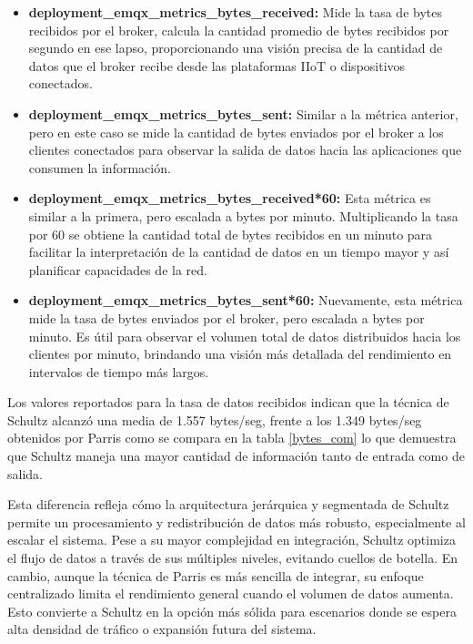 \begin{itemize}
    \item \textbf{deployment\_emqx\_metrics\_bytes\_received:} Mide la tasa de bytes recibidos por el broker, calcula la cantidad promedio de bytes recibidos por segundo en ese lapso, proporcionando una visión precisa de la cantidad de datos que el broker recibe desde las plataformas IIoT o dispositivos conectados.
    
    \item \textbf{deployment\_emqx\_metrics\_bytes\_sent:}  Similar a la métrica anterior, pero en este caso se mide la cantidad de bytes enviados por el broker a los clientes conectados para observar la salida de datos hacia las aplicaciones que consumen la información.
    
    \item \textbf{deployment\_emqx\_metrics\_bytes\_received*60:} Esta métrica es similar a la primera, pero escalada a bytes por minuto. Multiplicando la tasa por 60 se obtiene la cantidad total de bytes recibidos en un minuto para facilitar la interpretación de la cantidad de datos en un tiempo mayor y así planificar capacidades de la red.

    \item \textbf{deployment\_emqx\_metrics\_bytes\_sent*60:} Nuevamente, esta métrica mide la tasa de bytes enviados por el broker, pero escalada a bytes por minuto. Es útil para observar el volumen total de datos distribuidos hacia los clientes por minuto, brindando una visión más detallada del rendimiento en intervalos de tiempo más largos.
        
\end{itemize}


Los valores reportados para la tasa de datos recibidos indican que la técnica de Schultz alcanzó una media de 1.557 bytes/seg, frente a los 1.349 bytes/seg obtenidos por Parris como se compara en la tabla \ref{bytes_com} lo que demuestra que Schultz maneja una mayor cantidad de información tanto de entrada como de salida.



Esta diferencia refleja cómo la arquitectura jerárquica y segmentada de Schultz permite un procesamiento y redistribución de datos más robusto, especialmente al escalar el sistema. Pese a su mayor complejidad en integración, Schultz optimiza el flujo de datos a través de sus múltiples niveles, evitando cuellos de botella. En cambio, aunque la técnica de Parris es más sencilla de integrar, su enfoque centralizado limita el rendimiento general cuando el volumen de datos aumenta. Esto convierte a Schultz en la opción más sólida para escenarios donde se espera alta densidad de tráfico o expansión futura del sistema.




